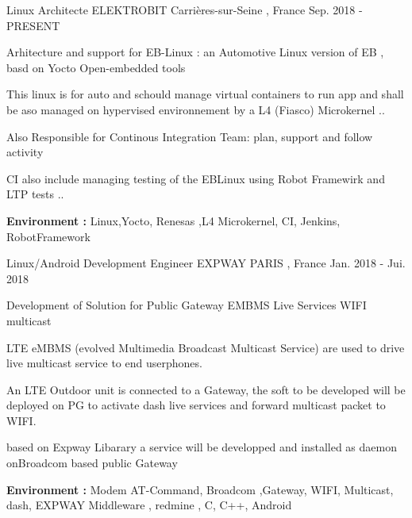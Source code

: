 


\begin{cventries}


\cventry
{Linux Architecte } %
{ELEKTROBIT} %
{Carrières-sur-Seine , France} %
{Sep. 2018 - PRESENT} %
{ %
\begin{cvitems}
\item {Arhitecture and support for EB-Linux : an Automotive Linux version of EB , basd on Yocto Open-embedded tools}
\item {This linux is for auto and schould manage virtual containers to run app and shall be aso managed on hypervised environnement by a L4 (Fiasco) Microkernel ..}
\item {Also Responsible for Continous Integration Team: plan, support and follow activity }
\item {CI also include managing testing of the EBLinux using Robot Framewirk and LTP tests ..  }
\item { \textbf{Environment :} Linux,Yocto, Renesas ,L4 Microkernel, CI, Jenkins, RobotFramework}
\end{cvitems}
}



\cventry
{Linux/Android Development Engineer } %
{EXPWAY} %
{PARIS , France} %
{Jan. 2018 - Jui. 2018} %
{ %
\begin{cvitems}
\item {Development of Solution for Public Gateway EMBMS Live Services WIFI multicast}
\item {LTE eMBMS (evolved Multimedia Broadcast Multicast Service) are used to drive live multicast service to end userphones.}
\item { An LTE  Outdoor unit is connected to a Gateway, the soft to be developed will be deployed on PG to activate dash live services and forward multicast packet to WIFI.}
\item {based on Expway Libarary a service will be developped and installed as daemon onBroadcom based public Gateway}
\item { \textbf{Environment :} Modem AT-Command, Broadcom ,Gateway, WIFI, Multicast, dash, EXPWAY Middleware , redmine , C, C++, Android}
\end{cvitems}
}



\end{cventries}
